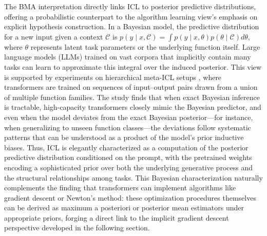 \documentclass[11pt]{article}
\begin{document}
The BMA interpretation directly links ICL to posterior predictive distributions, offering a probabilistic counterpart to the algorithm learning view's emphasis on explicit hypothesis construction. In a Bayesian model, the predictive distribution for a new input given a context \(\mathcal{C}\) is \(p(y \mid x, \mathcal{C}) = \int p(y \mid x, \theta) p(\theta \mid \mathcal{C}) d\theta\), where \(\theta\) represents latent task parameters or the underlying function itself. Large language models (LLMs) trained on vast corpora that implicitly contain many tasks can learn to approximate this integral over the induced posterior. This view is supported by experiments on hierarchical meta-ICL setups \cite{ref2}, where transformers are trained on sequences of input--output pairs drawn from a union of multiple function families. The study finds that when exact Bayesian inference is tractable, high-capacity transformers closely mimic the Bayesian predictor, and even when the model deviates from the exact Bayesian posterior---for instance, when generalizing to unseen function classes---the deviations follow systematic patterns that can be understood as a product of the model's prior inductive biases. Thus, ICL is elegantly characterized as a computation of the posterior predictive distribution conditioned on the prompt, with the pretrained weights encoding a sophisticated prior over both the underlying generative process and the structural relationships among tasks. This Bayesian characterization naturally complements the finding that transformers can implement algorithms like gradient descent or Newton's method: these optimization procedures themselves can be derived as maximum a posteriori or posterior mean estimators under appropriate priors, forging a direct link to the implicit gradient descent perspective developed in the following section.
\end{document}
